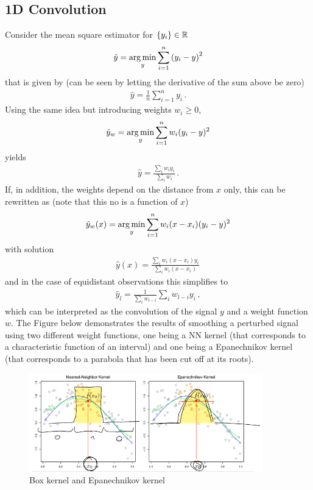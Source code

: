 \subsection*{1D Convolution}
Consider the mean square estimator for $\{y_i\} \in \mathbb{R}$
\begin{gather*}
  \hat{y} = \operatorname*{arg\,min}_y \sum_{i=1}^{n}{(y_i - y)}^2
\end{gather*}
that is given by (can be seen by letting the derivative of the sum above be
zero)
\begin{gather*}
  \hat{y} = \frac{1}{n} \sum_{i=1}^n y_i \,.
\end{gather*}
Using the same idea but introducing weights $w_i \ge 0$, \ie
\begin{gather*}
  \hat{y}_w = \operatorname*{arg\,min}_y \sum_{i=1}^n w_i (y_i - y)^2
\end{gather*}
yields
\begin{gather*}
  \hat{y} = \frac{\sum_i w_i y_i}{\sum_i w_i}\,.
\end{gather*}
If, in addition, the weights depend on the distance from $x$ only, this can be
rewritten as (note that this no is a function of $x$)
\begin{gather*}
  \hat{y}_w(x) = \operatorname*{arg\,min}_y \sum_{i=1}^n w_i(x - x_i) (y_i - y)^2
\end{gather*}
with solution
\begin{gather*}
  \hat{y}(x) = \frac{\sum_i w_i(x- x_i) y_i}{\sum_i w_i(x - x_i)}\,
\end{gather*}
and in the case of equidistant observations this simplifies to
\begin{gather*}
  \hat{y}_l = \frac{1}{\sum_i w_{l-i}}\sum_i w_{l-i} y_i\,,
\end{gather*}
which can be interpreted as the convolution of the signal $y$ and a weight
function $w$. The Figure below demonstrates the results of smoothing a perturbed
signal using two different weight functions, one being a NN kernel (that
corresponds to a characteristic function of an interval) and one being a
Epanechnikov kernel (that corresponds to a parabola that has been cut off at its
roots).

\begin{figure}[htpb]
  \centering \includegraphics[width=0.9\textwidth,trim={0 1mm 0
    0},clip]{Figures/convolution_weight_examples.png}
  \caption{Box kernel and Epanechnikov kernel}%
  \label{fig:conv:kernel}
\end{figure}

